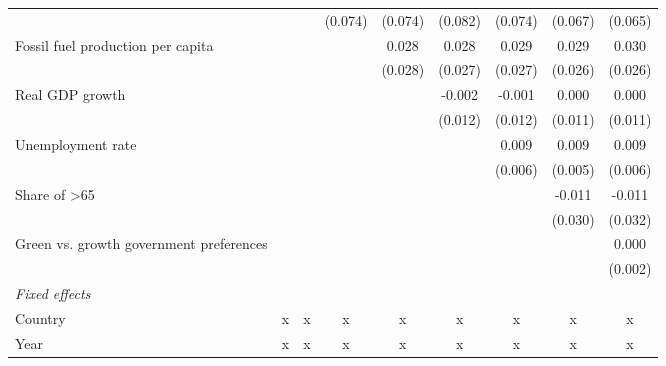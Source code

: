 \begin{table}[htbp]
\begin{tabular}{lcccccccc}
                                              &                &               & (0.074) & (0.074)      & (0.082)      & (0.074)      & (0.067)       & (0.065)\\   
      Fossil fuel production per capita       &                &               &         & 0.028        & 0.028        & 0.029        & 0.029         & 0.030\\   
                                              &                &               &         & (0.028)      & (0.027)      & (0.027)      & (0.026)       & (0.026)\\   
      Real GDP growth                         &                &               &         &              & -0.002       & -0.001       & 0.000         & 0.000\\   
                                              &                &               &         &              & (0.012)      & (0.012)      & (0.011)       & (0.011)\\   
      Unemployment rate                       &                &               &         &              &              & 0.009        & 0.009         & 0.009\\   
                                              &                &               &         &              &              & (0.006)      & (0.005)       & (0.006)\\   
      Share of >65                            &                &               &         &              &              &              & -0.011        & -0.011\\   
                                              &                &               &         &              &              &              & (0.030)       & (0.032)\\   
      Green vs. growth government preferences &                &               &         &              &              &              &               & 0.000\\   
                                              &                &               &         &              &              &              &               & (0.002)\\   
      \emph{Fixed effects}\\
      Country                                 & x              & x             & x       & x            & x            & x            & x             & x\\  
      Year                                    & x              & x             & x       & x            & x            & x            & x             & x\\  

\end{tabular}
\end{table}
